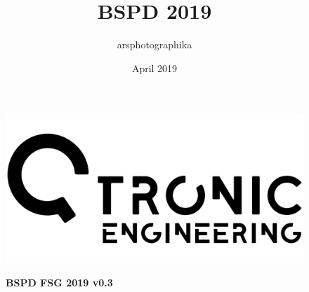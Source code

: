 \documentclass[a4paper,12pt,oneside,pdflatex,italian,final,twocolumn]{article}
\title{BSPD 2019}
\author{arsphotographika }
\date{April 2019}
\begin{document}
\pagestyle{fancy}

\chead {\today}


\onecolumn

\begin{figure}
\begin{minipage}{0.47\textwidth}
\centering
\includegraphics[width=.7\textwidth,left,]{logo.png}

\end{minipage}
\hfill
\begin{minipage}{0.47\textwidth}
\raggedleft
\Huge \textbf{BSPD FSG 2019 v0.3}
\end{minipage}
\end{figure}
\end{document}

